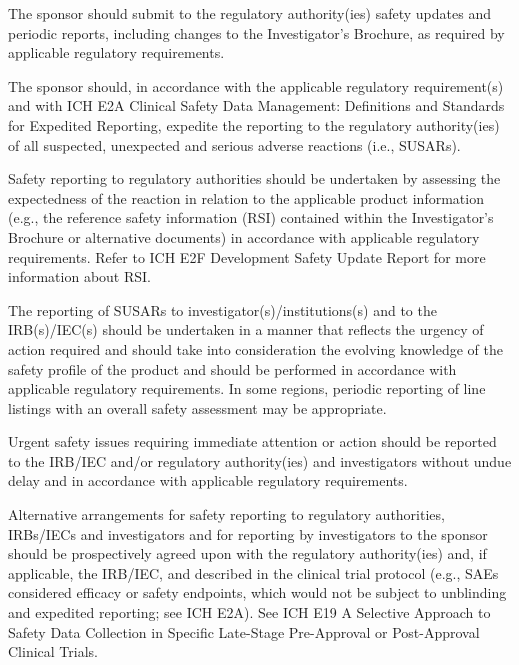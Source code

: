 \documentclass[11pt]{article}
\begin{document}
\begin{description}[leftmargin=2.5cm,style=sameline]

\item[(a)] The sponsor should submit to the regulatory authority(ies) safety updates and periodic reports, including changes to the Investigator's Brochure, as required by applicable regulatory requirements.

\item[(b)] The sponsor should, in accordance with the applicable regulatory requirement(s) and with ICH E2A Clinical Safety Data Management: Definitions and Standards for Expedited Reporting, expedite the reporting to the regulatory authority(ies) of all suspected, unexpected and serious adverse reactions (i.e., SUSARs).

\item[(c)] Safety reporting to regulatory authorities should be undertaken by assessing the expectedness of the reaction in relation to the applicable product information (e.g., the reference safety information (RSI) contained within the Investigator's Brochure or alternative documents) in accordance with applicable regulatory requirements. Refer to ICH E2F Development Safety Update Report for more information about RSI.

\item[(d)] The reporting of SUSARs to investigator(s)/institutions(s) and to the IRB(s)/IEC(s) should be undertaken in a manner that reflects the urgency of action required and should take into consideration the evolving knowledge of the safety profile of the product and should be performed in accordance with applicable regulatory requirements. In some regions, periodic reporting of line listings with an overall safety assessment may be appropriate.

\item[(e)] Urgent safety issues requiring immediate attention or action should be reported to the IRB/IEC and/or regulatory authority(ies) and investigators without undue delay and in accordance with applicable regulatory requirements.

\item[(f)] Alternative arrangements for safety reporting to regulatory authorities, IRBs/IECs and investigators and for reporting by investigators to the sponsor should be prospectively agreed upon with the regulatory authority(ies) and, if applicable, the IRB/IEC, and described in the clinical trial protocol (e.g., SAEs considered efficacy or safety endpoints, which would not be subject to unblinding and expedited reporting; see ICH E2A). See ICH E19 A Selective Approach to Safety Data Collection in Specific Late-Stage Pre-Approval or Post-Approval Clinical Trials.

\end{description}
\end{document}
